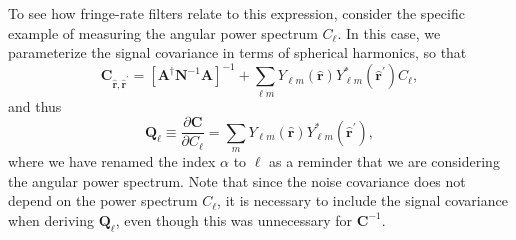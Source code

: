\documentclass[twocolumn,apj,numberedappendix]{emulateapj}
\def\r{\mathbf{r}}
\begin{document}
To see how fringe-rate filters relate to this expression, consider the specific example of measuring the angular power spectrum $C_\ell$.  In this case, we parameterize the signal covariance in terms of spherical harmonics, so that
\begin{equation}
\mathbf{C}_{\hat{\r}, \hat{\r}^\prime} = [ \mathbf{A}^\dagger \mathbf{N}^{-1} \mathbf{A} ]^{-1} + \sum_{\ell m} Y_{\ell m} ( \hat{\r}) Y^*_{\ell m} (\hat{\r}^\prime) C_\ell,
\end{equation}
and thus
\begin{equation}
\label{eq:CEllQ}
\mathbf{Q}_\ell \equiv \frac{\partial \mathbf{C}}{\partial C_\ell} = \sum_{m} Y_{\ell m} ( \hat{\r}) Y^*_{\ell m} (\hat{\r}^\prime),
\end{equation}
where we have renamed the index $\alpha$ to $\ell$ as a reminder that we are considering the angular power spectrum.  Note that since the noise covariance does not depend on the power spectrum $C_\ell$, it is necessary to include the signal covariance when deriving $\mathbf{Q}_\ell$, even though this was unnecessary for $\mathbf{C}^{-1}$.
\end{document}
